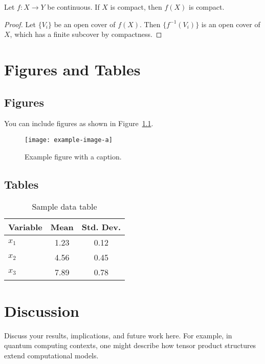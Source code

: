 \documentclass[12pt,a4paper]{report}
\begin{document}
\begin{theorem}
Let \( f: X \to Y \) be continuous. If \( X \) is compact, then \( f(X) \) is compact.
\end{theorem}

\begin{proof}
Let \( \{V_i\} \) be an open cover of \( f(X) \). Then \( \{f^{-1}(V_i)\} \) is an open cover of \( X \), which has a finite subcover by compactness.
\end{proof}

\chapter{Figures and Tables}

\section{Figures}
You can include figures as shown in Figure~\ref{fig:example}.

\begin{figure}[h!]
    \centering
    \texttt{[image: example-image-a]}
    \caption{Example figure with a caption.}
    \label{fig:example}
\end{figure}

\section{Tables}
\begin{table}[h!]
    \centering
    \caption{Sample data table}
    \begin{tabular}{lcc}
        \toprule
        Variable & Mean & Std. Dev. \\
        \midrule
        $x_1$ & 1.23 & 0.12 \\
        $x_2$ & 4.56 & 0.45 \\
        $x_3$ & 7.89 & 0.78 \\
        \bottomrule
    \end{tabular}
\end{table}

\chapter{Discussion}

Discuss your results, implications, and future work here. For example, in quantum computing contexts, one might describe how tensor product structures extend computational models.
\end{document}
